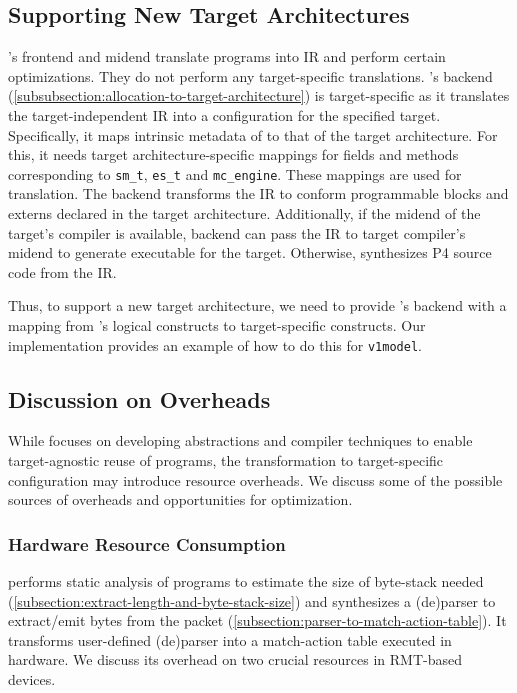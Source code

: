\documentclass[letterpaper,twocolumn,10pt]{article}
\begin{document}
\subsection{Supporting New Target Architectures}
\label{sec:new-target}
\ucomp's frontend and midend translate \ulang programs into \uarch IR
and perform certain optimizations. They do not perform any
target-specific translations. \ucomp's backend
(\cref{subsubsection:allocation-to-target-architecture}) is
target-specific as it translates the target-independent \uarch IR into
a configuration for the specified target. Specifically, it maps
intrinsic metadata of \uarch to that of the target architecture. For
this, it needs target architecture-specific mappings for fields and
methods corresponding to \texttt{sm\_t}, \texttt{es\_t} and
\texttt{mc\_engine}. These mappings are used for translation. The
backend transforms the IR to conform programmable blocks and externs
declared in the target architecture. Additionally, if the midend of
the target's compiler is available, \ucomp backend can pass the IR to
target compiler's midend to generate executable for the target.
Otherwise, \ucomp synthesizes P4 source code from the IR.

Thus, to support a new target architecture, we need to provide
\ucomp's backend with a mapping from \uarch's logical constructs to
target-specific constructs. Our implementation provides an example of
how to do this for \texttt{v1model}.


\subsection{Discussion on Overheads}
\label{sec:overheads}
While \ulang focuses on developing abstractions and compiler
techniques to enable target-agnostic reuse of programs, the
transformation to target-specific configuration may introduce resource
overheads. We discuss some of the possible sources of overheads and
opportunities for optimization.

\subsubsection{Hardware Resource Consumption}
\ucomp performs static analysis of \ulang programs to estimate the
size of byte-stack needed
(\cref{subsection:extract-length-and-byte-stack-size}) and synthesizes
a (de)parser to extract/emit bytes from the packet
(\cref{subsection:parser-to-match-action-table}). It transforms
user-defined (de)parser into a match-action table executed in
hardware. We discuss its overhead on two crucial resources in
RMT-based devices.
\end{document}
